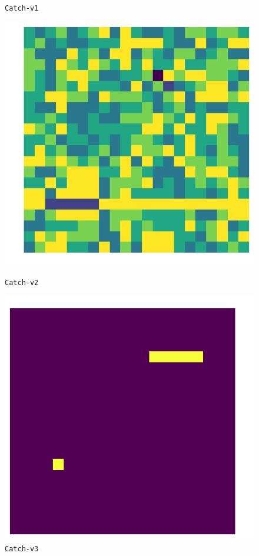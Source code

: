 \begin{figure}[ht]
\begin{minipage}[b]{0.35\linewidth}
\caption{\texttt{Catch-v1}}
\label{fig:fig2}
\end{minipage}
\hspace{0.5cm}
\begin{minipage}[b]{0.35\linewidth}
\centering
\includegraphics[width=\textwidth]{./Images/Chapter08/catch_v3}
\caption{\texttt{Catch-v2}}
\label{fig:fig3}
\end{minipage}
\hspace{0.5cm}
\begin{minipage}[b]{0.35\linewidth}
\centering
\includegraphics[width=\textwidth]{./Images/Chapter08/catch_v1}
\caption{\texttt{Catch-v3}}
\label{fig:fig4}
\end{minipage}
\end{figure}



